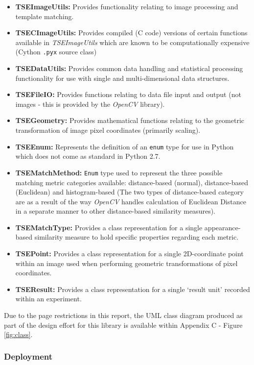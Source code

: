 \begin{itemize}
	\item \textbf{TSEImageUtils:} Provides functionality relating to image processing and template matching.
	\item \textbf{TSECImageUtils:} Provides compiled (C code) versions of certain functions available in \textit{TSEImageUtils} which are known to be computationally expensive (Cython \texttt{.pyx} source class)
	\item \textbf{TSEDataUtils:} Provides common data handling and statistical processing functionality for use with single and multi-dimensional data structures.
	\item \textbf{TSEFileIO:} Provides functions relating to data file input and output (not images - this is provided by the \textit{OpenCV} library).
	\item \textbf{TSEGeometry:} Provides mathematical functions relating to the geometric transformation of image pixel coordinates (primarily scaling).
	\item \textbf{TSEEnum:} Represents the definition of an \texttt{enum} type for use in Python which does not come as standard in Python 2.7.
	\item \textbf{TSEMatchMethod:} \texttt{Enum} type used to represent the three possible matching metric categories available: distance-based (normal), distance-based (Euclidean) and histogram-based (The two types of distance-based category are as a result of the way \textit{OpenCV} handles calculation of Euclidean Distance in a separate manner to other distance-based similarity measures).
	\item \textbf{TSEMatchType:} Provides a class representation for a single appearance-based similarity measure to hold specific properties regarding each metric.
	\item \textbf{TSEPoint:} Provides a class representation for a single 2D-coordinate point within an image used when performing geometric transformations of pixel coordinates.
	\item \textbf{TSEResult:} Provides a class representation for a single `result unit' recorded within an experiment.
\end{itemize}

	Due to the page restrictions in this report, the UML class diagram produced as part of the design effort for this library is available within Appendix C - Figure \ref{fig:class}.

\subsubsection{Deployment}

